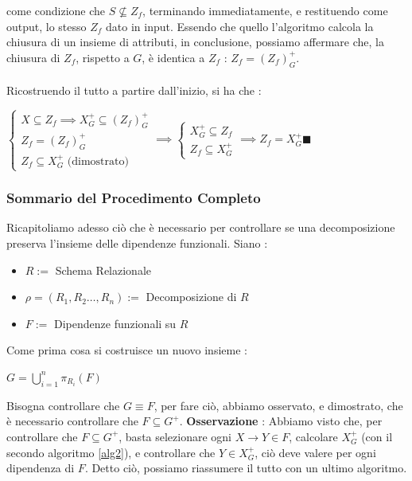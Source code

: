 \documentclass[12pt, letterpaper]{article}
\newcommand{\acc}{\\\hphantom{}\\}
\begin{document}
come condizione che   \(S \nsubseteq  Z_f\), terminando immediatamente, e restituendo come output, lo stesso \(Z_f\) dato in input. Essendo 
che quello l'algoritmo calcola la chiusura di un insieme di attributi, in conclusione, possiamo affermare che, la chiusura di \(Z_f\), 
rispetto a \(G\), è identica a \(Z_f\) : \(Z_f=(Z_f)_G^+\).\acc 
Ricostruendo il tutto a partire dall'inizio, si ha che : 
\begin{center}
    \(
    \begin{cases}
        X\subseteq Z_f \implies X^+_G\subseteq (Z_f)_G^+\\ 
        Z_f=(Z_f)_G^+\\  Z_f\subseteq  X^+_G \text{ (dimostrato)}
    \end{cases}   \implies 
    \begin{cases}
        X^+_G\subseteq Z_f\\  Z_f\subseteq  X^+_G
    \end{cases}\implies  Z_f =  X^+_G
    \)\hphantom{text}\(\blacksquare\)
\end{center}
\subsubsection{Sommario del Procedimento Completo}
Ricapitoliamo adesso ciò che è necessario per controllare se una decomposizione preserva l'insieme delle dipendenze funzionali. Siano : \begin{itemize}
    \item \(R:=\) Schema Relazionale
    \item \(\rho=(R_1,R_2\dots,R_n):=\) Decomposizione di \(R\)
    \item \(F:=\) Dipendenze funzionali su \(R\)
\end{itemize}
Come prima cosa si costruisce un nuovo insieme : \begin{center}
    \(G=\displaystyle\bigcup^n_{i=1}\pi_{R_i}(F)\)
\end{center}
Bisogna controllare che \(G\equiv F\), per fare ciò, abbiamo osservato, e dimostrato, che è necessario controllare che \(F\subseteq G^+\). 
\textbf{Osservazione }: Abbiamo visto che, per controllare che \(F\subseteq G^+\), basta 
selezionare ogni \(X\rightarrow Y \in F\), calcolare \(X_G^+\) (con il secondo algoritmo \ref{alg2}), e controllare che 
\(Y\in X_G^+\), ciò deve valere per ogni dipendenza di \(F\). Detto ciò, possiamo riassumere il tutto con un ultimo algoritmo.
\end{document}
